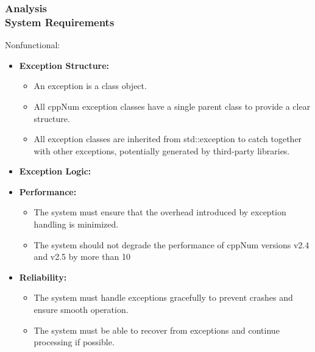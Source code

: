 \documentclass[ucs,10pt]{beamer}
\begin{document}
\begin{frame}
\frametitle{Analysis \\
	\small \color{rwth-blue} System Requirements}
	Nonfunctional:
	\begin{itemize}
		\item \textbf{Exception Structure:}
		\begin{itemize}
			\item An exception is a class object.
			\item All cppNum exception classes have a single parent class to provide a clear structure.
			\item All exception classes are inherited from std::exception to catch together with other exceptions, potentially generated by third-party libraries.
		\end{itemize}
             \item \textbf{Exception Logic:}
		\item \textbf{Performance:}
		\begin{itemize}
			\item The system must ensure that the overhead introduced by exception handling is minimized.
			\item The system should not degrade the performance of cppNum versions v2.4 and v2.5 by more than 10%
		\end{itemize}
		\item \textbf{Reliability:}
		\begin{itemize}
			\item The system must handle exceptions gracefully to prevent crashes and ensure smooth operation.
			\item The system must be able to recover from exceptions and continue processing if possible.
		\end{itemize}
        \end{itemize}
\end{frame}
\end{document}
